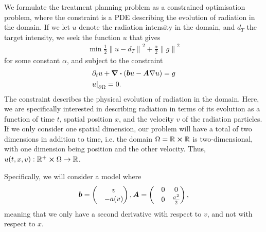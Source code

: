 \documentclass{article}  %
\begin{document}






We formulate the treatment planning problem as a constrained optimisation problem, where the constraint is a PDE describing the evolution of radiation in the domain. If we let $u$ denote the radiation intensity in the domain, and $d_T$ the target intensity, we seek the function $u$ that gives
%
\begin{align} 
    \label{eq:to-minimise}
    \min \frac{1}{2} {\lVert u - d_T \rVert}^2 + \frac{\alpha}{2} {\lVert g \rVert}^2
\end{align}
%
for some constant $\alpha$, and subject to the constraint
%
\begin{align}
    \label{eq:pde-constraint}
    &\partial_t u + \div{(\boldsymbol{b} u - \boldsymbol{A} \nabla u)} = g\\
    &{u \rvert}_{\partial \Omega} = 0.
\end{align}
%
The constraint describes the physical evolution of radiation in the domain. Here, we are specifically interested in describing radiation in terms of its evolution as a function of time $t$, spatial position $x$, and the velocity $v$ of the radiation particles. If we only consider one spatial dimension, our problem will have a total of two dimensions in addition to time, i.e. the domain $\Omega=\mathbb{R}\cross\mathbb{R}$ is two-dimensional, with one dimension being position and the other velocity. Thus, $u(t,x,v): \mathbb{R}^{+} \cross \Omega \rightarrow \mathbb{R}$.

Specifically, we will consider a model where
%
\begin{equation}
\boldsymbol{b} = 
\begin{pmatrix}
    &v\\
    &-a(v)
\end{pmatrix},
\boldsymbol{A} = 
\begin{pmatrix}
    &0 &0\\
    &0 &\frac{\sigma^2}{2}
\end{pmatrix},
\end{equation}
%
meaning that we only have a second derivative with respect to $v$, and not with respect to $x$.
\end{document}
